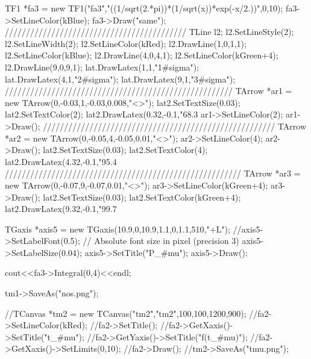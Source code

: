 {TF1 *fa3 = new TF1("fa3","((1/sqrt(2.*pi))*(1/sqrt(x))*exp(-x/2.))",0,10);
fa3->SetLineColor(kBlue);
fa3->Draw("same");
///////////////////////////////////////////
TLine l2;
l2.SetLineStyle(2);
l2.SetLineWidth(2);
l2.SetLineColor(kRed);
l2.DrawLine(1,0,1,1);
l2.SetLineColor(kBlue);
l2.DrawLine(4,0,4,1);
l2.SetLineColor(kGreen+4);
l2.DrawLine(9,0,9,1);
lat.DrawLatex(1,1,"1#sigma");
lat.DrawLatex(4,1,"2#sigma");
lat.DrawLatex(9,1,"3#sigma");
//////////////////////////////////////////////////////
TArrow *ar1 = new TArrow(0,-0.03,1,-0.03,0.008,"<>");
lat2.SetTextSize(0.03);
lat2.SetTextColor(2);
lat2.DrawLatex(0.32,-0.1,"68.3%
ar1->SetLineColor(2);
ar1->Draw();
///////////////////////////////////////////////////////
TArrow *ar2 = new TArrow(0,-0.05,4,-0.05,0.01,"<>");
ar2->SetLineColor(4);
ar2->Draw();
lat2.SetTextSize(0.03);
lat2.SetTextColor(4);
lat2.DrawLatex(4.32,-0.1,"95.4%
////////////////////////////////////////////////////////
TArrow *ar3 = new TArrow(0,-0.07,9,-0.07,0.01,"<>");
ar3->SetLineColor(kGreen+4);
ar3->Draw();
lat2.SetTextSize(0.03);
lat2.SetTextColor(kGreen+4);
lat2.DrawLatex(9.32,-0.1,"99.7%



TGaxis *axis5 = new TGaxis(10.9,0,10.9,1.1,0,1.1,510,"+L");
//axis5->SetLabelFont(0.5); // Absolute font size in pixel (precision 3)
axis5->SetLabelSize(0.04);
axis5->SetTitle("P_{#mu}");
axis5->Draw();


cout<<fa3->Integral(0,4)<<endl;

tm1->SaveAs("nos.png");

//TCanvas *tm2 = new TCanvas("tm2","tm2",100,100,1200,900);
//fa2->SetLineColor(kRed);
//fa2->SetTitle();
//fa2->GetXaxis()->SetTitle("t_{#mu}");
//fa2->GetYaxis()->SetTitle("f(t_{#mu})");
//fa2->GetXaxis()->SetLimits(0,10);
//fa2->Draw();
//tm2->SaveAs("tmu.png");

}
